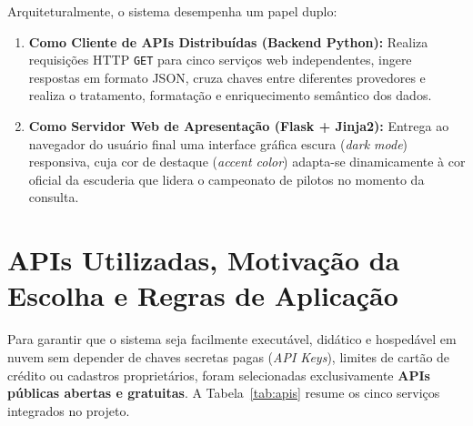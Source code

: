 \documentclass[12pt]{article}
\begin{document}
Arquiteturalmente, o sistema desempenha um papel duplo:
\begin{enumerate}
    \item \textbf{Como Cliente de APIs Distribuídas (Backend Python):} Realiza requisições HTTP \texttt{GET} para cinco serviços web independentes, ingere respostas em formato JSON, cruza chaves entre diferentes provedores e realiza o tratamento, formatação e enriquecimento semântico dos dados.
    \item \textbf{Como Servidor Web de Apresentação (Flask + Jinja2):} Entrega ao navegador do usuário final uma interface gráfica escura (\textit{dark mode}) responsiva, cuja cor de destaque (\textit{accent color}) adapta-se dinamicamente à cor oficial da escuderia que lidera o campeonato de pilotos no momento da consulta.
\end{enumerate}

\section{APIs Utilizadas, Motivação da Escolha e Regras de Aplicação}

Para garantir que o sistema seja facilmente executável, didático e hospedável em nuvem sem depender de chaves secretas pagas (\textit{API Keys}), limites de cartão de crédito ou cadastros proprietários, foram selecionadas exclusivamente \textbf{APIs públicas abertas e gratuitas}. A Tabela~\ref{tab:apis} resume os cinco serviços integrados no projeto.

\begin{table}[h!]
\centering
\caption{Serviços web e APIs REST consumidas pelo sistema F1Weather}
\label{tab:apis}
\end{table}
\end{document}
